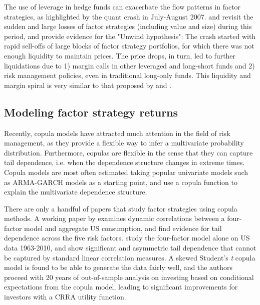 The use of leverage in hedge funds can exacerbate the flow patterns in factor strategies, as highlighted by the quant crash in July-August 2007. \textcite{KhandaniLo2011} and \textcite{KhandaniLo2007} revisit the sudden and large losses of factor strategies (including value and size) during this period, and provide evidence for the "Unwind hypothesis": The crash started with rapid sell-offs of large blocks of factor strategy portfolios, for which there was not enough liquidity to maintain prices. The price drops, in turn, led to further liquidations due to 1) margin calls in other leveraged and long-short funds and 2) risk management policies, even in traditional long-only funds. This liquidity and margin spiral is very similar to that proposed by \textcite{Brunnermeier2009} and \textcite{BrunnermeierPedersen2009}.


\subsection{Modeling factor strategy returns}

Recently, copula models have attracted much attention in the field of risk management, as they provide a flexible way to infer a multivariate probability distribution. Furthermore, copulas are flexible in the sense that they can capture tail dependence, i.e. when the dependence structure changes in extreme times. Copula models are most often estimated taking popular univariate models such as ARMA-GARCH models as a starting point, and use a copula function to explain the multivariate dependence structure.

There are only a handful of papers that study factor strategies using copula methods. A working paper by \textcite{CholleteNing2012} examines dynamic correlations between a four-factor model and aggregate US consumption, and find evidence for tail dependence across the five risk factors. \textcite{ChristoffersenLanglois2013} study the four-factor model alone on US data 1963-2010, and show significant and asymmetric tail dependence that cannot be captured by standard linear correlation measures. A skewed Student's \textit{t} copula model is found to be able to generate the data fairly well, and the authors proceed with 20 years of out-of-sample analysis on investing based on conditional expectations from the copula model, leading to significant improvements for investors with a CRRA utility function.
